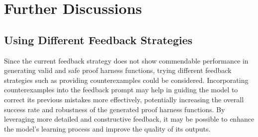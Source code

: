 \documentclass[onecolumn]{NobArticle}
\begin{document}
\vspace{11pt}
\section{Further Discussions}
\subsection{Using Different Feedback Strategies}
\quad Since the current feedback strategy does not show commendable performance in generating valid and safe proof harness functions, trying different feedback strategies such as providing counterexamples could be considered. Incorporating counterexamples into the feedback prompt may help in guiding the model to correct its previous mistakes more effectively, potentially increasing the overall success rate and robustness of the generated proof harness functions. By leveraging more detailed and constructive feedback, it may be possible to enhance the model's learning process and improve the quality of its outputs.


\printbibliography
\end{document}
